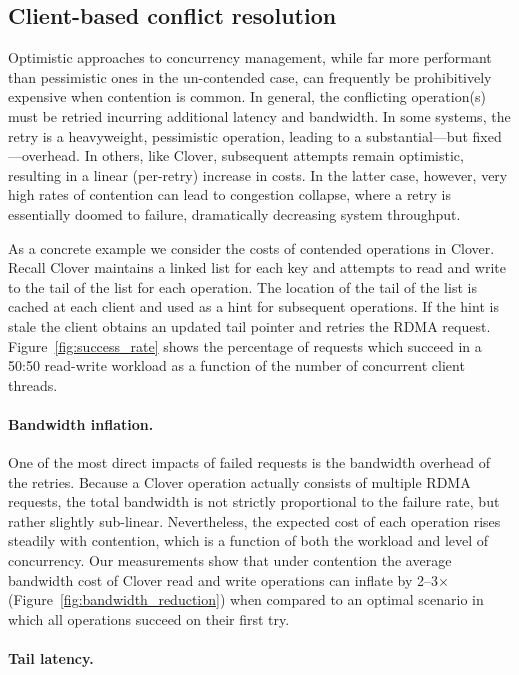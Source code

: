 \subsection{Client-based conflict resolution}

Optimistic approaches to concurrency management, while far more
performant than pessimistic ones in the un-contended case, can
frequently be prohibitively expensive when contention is common.  In
general, the conflicting operation(s) must be retried incurring
additional latency and bandwidth.  In some systems, the retry is a
heavyweight, pessimistic operation, leading to a substantial---but
fixed---overhead.  In others, like Clover, subsequent attempts remain
optimistic, resulting in a linear (per-retry) increase in costs.
In the latter case, however, very high rates of contention can lead to
congestion collapse, where a retry is essentially doomed to failure,
dramatically decreasing system throughput.

As a concrete example we consider the costs of contended operations in
Clover.  Recall Clover maintains a linked list for each key and
attempts to read and write to the tail of the list for each
operation. The location of the tail of the list is cached at each
client and used as a hint for subsequent operations.  If the hint is
stale the client obtains an updated tail pointer and retries the
RDMA request.  Figure~\ref{fig:success_rate} shows the percentage of
requests which succeed in a 50:50 read-write workload as a
function of the number of concurrent client threads.

\paragraph{Bandwidth inflation.} 

One of the most direct impacts of failed requests is the bandwidth
overhead of the retries.  Because a Clover operation actually
consists of multiple RDMA requests, the total bandwidth is not
strictly proportional to the failure rate, but rather slightly
sub-linear.  Nevertheless, the expected cost of each operation rises
steadily with contention, which is a function of both the workload and
level of concurrency.  Our measurements show that under contention the
average bandwidth cost of Clover read and write operations can inflate
by 2--3$\times$ (Figure~\ref{fig:bandwidth_reduction}) when compared
to an optimal scenario in which all operations succeed on their first
try.

\paragraph{Tail latency.}

